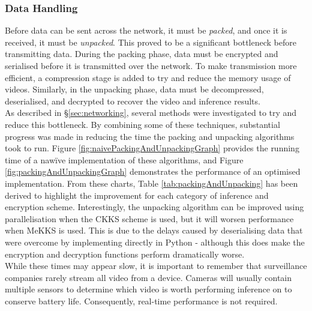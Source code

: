 \subsubsection{Data Handling}
\setlength{\leftskip}{0.5cm}
\indent \indent
Before data can be sent across the network, it must be \textit{packed}, and once it is received, it must be \textit{unpacked}. This proved to be a significant bottleneck before transmitting data. During the packing phase, data must be encrypted and serialised before it is transmitted over the network. To make transmission more efficient, a compression stage is added to try and reduce the memory usage of videos. Similarly, in the unpacking phase, data must be decompressed, deserialised, and decrypted to recover the video and inference results.
\smallskip \\ \indent
As described in §\ref{sec:networking}, several methods were investigated to try and reduce this bottleneck. By combining some of these techniques, substantial progress was made in reducing the time the packing and unpacking algorithms took to run. Figure \ref{fig:naivePackingAndUnpackingGraph} provides the running time of a naw\"ive implementation of these algorithms, and Figure \ref{fig:packingAndUnpackingGraph} demonstrates the performance of an optimised implementation. From these charts, Table \ref{tab:packingAndUnpacking} has been derived to highlight the improvement for each category of inference and encryption scheme. Interestingly, the unpacking algorithm can be improved using parallelisation when the CKKS scheme is used, but it will worsen performance when MeKKS is used. This is due to the delays caused by deserialising data that were overcome by implementing directly in Python - although this does make the encryption and decryption functions perform dramatically worse.
\smallskip \\ \indent
While these times may appear slow, it is important to remember that surveillance companies rarely stream all video from a device. Cameras will usually contain multiple sensors to determine which video is worth performing inference on to conserve battery life. Consequently, real-time performance is not required.

